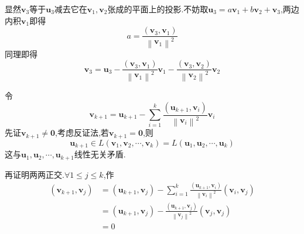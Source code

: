 \begin{formal}
\begin{Proof}

显然$\bm{v}_3$等于$\bm{u}_3$减去它在$\bm{v}_1,\bm{v}_2$张成的平面上的投影.不妨取$\bm{u}_3=a\bm{v}_1+b\bm{v}_2+\bm{v}_3$,两边内积$\bm{v}_1$即得\[
a=\frac{\left(\bm{v}_3,\bm{v}_1\right)}{\left\lVert \bm{v}_1\right\rVert ^2}
\]同理即得\[
\bm{v}_3=\bm{u}_3-\frac{\left(\bm{v}_3,\bm{v}_1\right)}{\left\lVert \bm{v}_1\right\rVert ^2}\bm{v}_1-\frac{\left(\bm{v}_3,\bm{v}_2\right)}{\left\lVert \bm{v}_2\right\rVert ^2}\bm{v}_2
\]

令\[
\bm{v}_{k+1}=\bm{u}_{k+1}-\sum_{i=1}^{k}\frac{\left(\bm{u}_{k+1},\bm{v}_i\right)}{\left\lVert \bm{v}_i\right\rVert ^2}\bm{v}_i\tag{$\ast$}
\]先证$\bm{v}_{k+1}\neq\bm{0}$,考虑反证法,若$\bm{v}_{k+1}=\bm{0}$,则\[
\bm{u}_{k+1}\in L\left(
    \bm{v}_1,\bm{v}_2,\cdots,\bm{v}_k
\right)=L\left(
    \bm{u}_1,\bm{u}_2,\cdots,\bm{u}_k
\right)
\]这与$\bm{u}_1,
\bm{u}_2,\cdots,\bm{u}_{k+1}$线性无关矛盾.

再证明两两正交.$\forall 1\leqslant j\leqslant k$,作\begin{align*}
    \left(
        \bm{v}_{k+1},\bm{v}_j
    \right)&=\left(
        \bm{u}_{k+1},\bm{v}_j
    \right)-\sum_{i=1}^{k}\frac{\left(
        \bm{u}_{k+1},\bm{v}_i
    \right)}{\left\lVert \bm{v}_i\right\rVert ^2}\left(
        \bm{v}_i,\bm{v}_j
    \right)\\
    &=\left(
        \bm{u}_{k+1},\bm{v}_j
    \right)-\frac{\left(
        \bm{u}_{k+1},\bm{v}_j
    \right)}{\left\lVert \bm{v}_j\right\rVert ^2}\left(
        \bm{v}_j,\bm{v}_j
    \right)\\
    &=0
\end{align*}


\end{Proof}
\end{formal}
